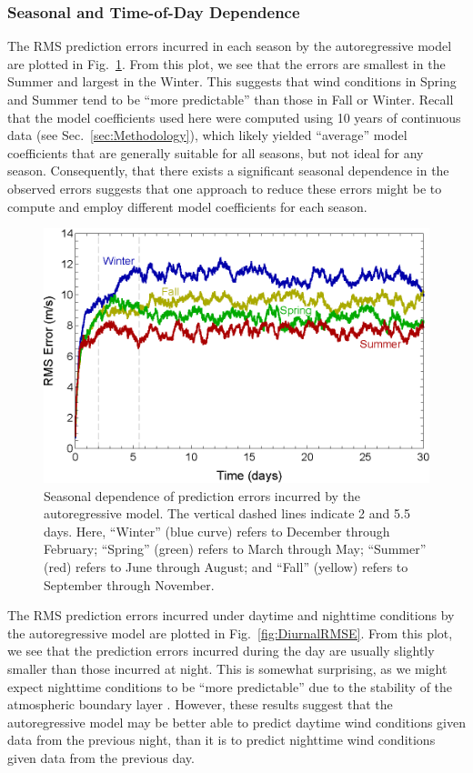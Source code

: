 \documentclass[11pt, oneside]{article}
\newcommand{\figref}[1]{Fig.~\ref{#1}}
\newcommand{\secref}[1]{Sec.~\ref{#1}}
\begin{document}
\subsubsection{Seasonal and Time-of-Day Dependence}
The RMS prediction errors incurred in each season by the autoregressive model are plotted in \figref{fig:SeasonalRMSE}.
From this plot, we see that the errors are smallest in the Summer and largest in the Winter.
This suggests that wind conditions in Spring and Summer tend to be ``more predictable'' than those in Fall or Winter.
Recall that the model coefficients used here were computed using 10 years of continuous data (see 
\secref{sec:Methodology}), which likely yielded ``average'' model coefficients that are generally suitable for all seasons, but not ideal for any season.
Consequently, that there exists a significant seasonal dependence in the observed errors suggests that one approach to reduce these errors might be to compute and employ different model coefficients for each season.

\begin{figure}[htb]
\centering
\includegraphics[width=0.7\columnwidth]{figures/SeasonalRMSPredictionError}
\caption{Seasonal dependence of prediction errors incurred by the autoregressive model.
The vertical dashed lines indicate 2 and 5.5 days.
Here, ``Winter'' (blue curve) refers to December through February;
``Spring'' (green) refers to March through May;
``Summer'' (red) refers to June through August; and
``Fall'' (yellow) refers to September through November.}
\label{fig:SeasonalRMSE}
\end{figure}

The RMS prediction errors incurred under daytime and nighttime conditions by the autoregressive model are plotted in \figref{fig:DiurnalRMSE}.
From this plot, we see that the prediction errors incurred during the day are usually slightly smaller than those incurred at night.
This is somewhat surprising, as we might expect nighttime conditions to be ``more predictable'' due to the stability of the atmospheric boundary layer \citep[Fig.~1.7]{Stull1988}.
However, these results suggest that the autoregressive model may be better able to predict daytime wind conditions given data from the previous night, than it is to predict nighttime wind conditions given data from the previous day.
\end{document}
